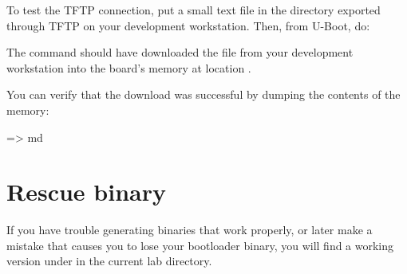 To test the TFTP connection, put a small text file in
the directory exported through TFTP on your development
workstation. Then, from U-Boot, do:


The  command should have downloaded the
 file from your development workstation into
the board's memory at location .

You can verify that the download was successful by dumping the
contents of the memory:

\begin{ubootinput}
=> md %
\end{ubootinput}

\section{Rescue binary}

If you have trouble generating binaries that work properly, or later
make a mistake that causes you to lose your bootloader binary, you
will find a working version under  in the current lab
directory.
